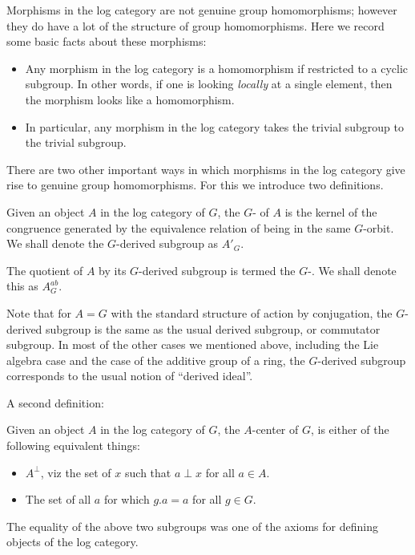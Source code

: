 \documentclass[a4paper]{amsart}
\begin{document}
Morphisms in the log category are not genuine group homomorphisms;
however they do have a lot of the structure of group
homomorphisms. Here we record some basic facts about these morphisms:

\begin{itemize}

\item Any morphism in the log category is a homomorphism if restricted
  to a cyclic subgroup. In other words, if one is looking {\em
    locally} at a single element, then the morphism looks like a homomorphism.

\item In particular, any morphism in the log category takes the
  trivial subgroup to the trivial subgroup.

\end{itemize}

There are two other important ways in which morphisms in the log
category give rise to genuine group homomorphisms. For this we
introduce two definitions.

\begin{definer}
  Given an object $A$ in the log category of $G$, the
  $G$- of $A$ is the kernel of the
  congruence generated by the equivalence relation of being in the
  same $G$-orbit. We shall denote the $G$-derived subgroup as $A'_G$.

  The quotient of $A$ by its $G$-derived subgroup is termed the
  $G$-. We shall denote this as $A^{ab}_G$.
\end{definer}

Note that for $A = G$ with the standard structure of action by
conjugation, the $G$-derived subgroup is the same as the usual derived
subgroup, or commutator subgroup. In most of the other cases we
mentioned above, including the Lie algebra case and the case of the
additive group of a ring, the $G$-derived subgroup corresponds to the
usual notion of ``derived ideal''.

A second definition:

\begin{definer}[$G$-center]
  Given an object $A$ in the log category of $G$, the $A$-center of
  $G$, is either of the following equivalent things:

  \begin{itemize}

  \item $A^\perp$, viz the set of $x$ such that $a \perp x$ for all $a
    \in A$.

  \item The set of all $a$ for which $g.a = a$ for all $g \in G$.

  \end{itemize}
  
  The equality of the above two subgroups was one of the axioms for
  defining objects of the log category.
\end{definer}
\end{document}
